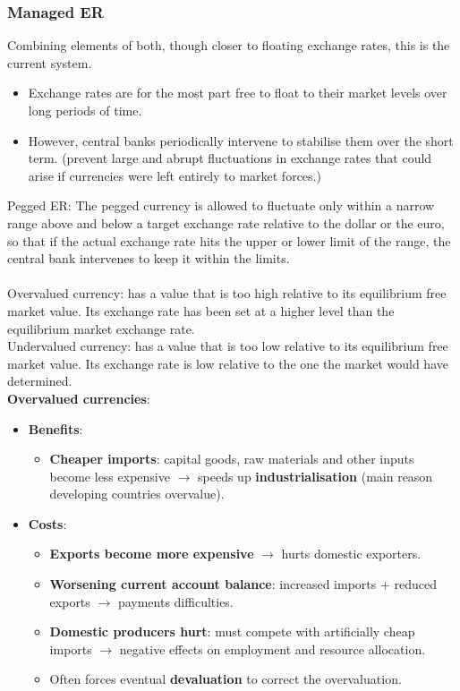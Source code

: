 \documentclass[a4paper,12pt]{article}
\begin{document}
\subsubsection*{Managed ER}
Combining elements of both, though closer to floating exchange rates, this is the current system. 
\begin{itemize}
  \item Exchange rates are for the most part free to float to their market levels over long periods of time.
  \item However, central banks periodically intervene to stabilise them over the short term. (prevent large and abrupt fluctuations in exchange rates that could arise if currencies were left entirely to market forces.)
\end{itemize}
Pegged ER: The pegged currency is allowed to fluctuate only within a narrow range above and below a target exchange rate relative to the dollar or the euro, so that if the actual exchange rate hits the upper or lower limit of the range, the central bank intervenes to keep it within the limits.\\\\
Overvalued currency: has a value that is too high relative to its equilibrium free market value. Its exchange rate has been set at a higher level than the equilibrium market exchange rate.\\
Undervalued currency: has a value that is too low relative to its equilibrium free market value. Its exchange rate is low relative to the one the market would have determined.\\
\textbf{Overvalued currencies}:
\begin{itemize}
  \item \textbf{Benefits}:
  \begin{itemize}
    \item \textbf{Cheaper imports}: capital goods, raw materials and other inputs become less expensive $\to$ speeds up \textbf{industrialisation} (main reason developing countries overvalue).
  \end{itemize}
  \item \textbf{Costs}:
  \begin{itemize}
    \item \textbf{Exports become more expensive} $\to$ hurts domestic exporters.
    \item \textbf{Worsening current account balance}: increased imports + reduced exports $\to$ payments difficulties.
    \item \textbf{Domestic producers hurt}: must compete with artificially cheap imports $\to$ negative effects on employment and resource allocation.
    \item Often forces eventual \textbf{devaluation} to correct the overvaluation.
  \end{itemize}
\end{itemize}
\end{document}
